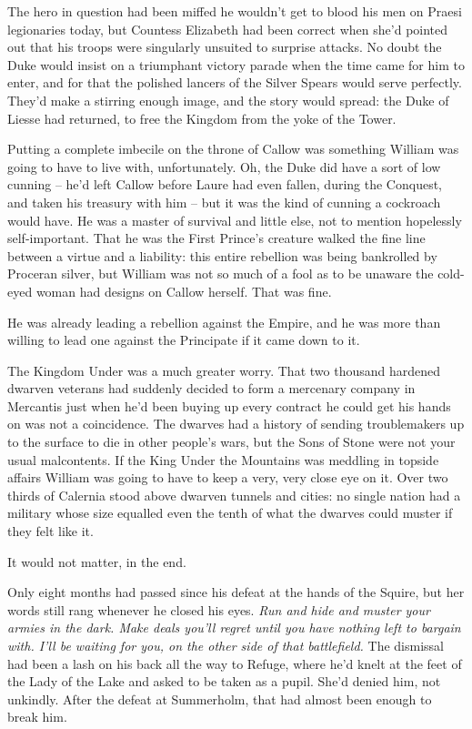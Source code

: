 \documentclass[12pt, openany]{book}
\begin{document}
The hero in question had been miffed he wouldn’t get to blood his men on Praesi legionaries today, but Countess Elizabeth had been correct when she’d pointed out that his troops were singularly unsuited to surprise attacks. No doubt the Duke would insist on a triumphant victory parade when the time came for him to enter, and for that the polished lancers of the Silver Spears would serve perfectly. They’d make a stirring enough image, and the story would spread: the Duke of Liesse had returned, to free the Kingdom from the yoke of the Tower.

Putting a complete imbecile on the throne of Callow was something William was going to have to live with, unfortunately. Oh, the Duke did have a sort of low cunning – he’d left Callow before Laure had even fallen, during the Conquest, and taken his treasury with him – but it was the kind of cunning a cockroach would have. He was a master of survival and little else, not to mention hopelessly self-important. That he was the First Prince’s creature walked the fine line between a virtue and a liability: this entire rebellion was being bankrolled by Proceran silver, but William was not so much of a fool as to be unaware the cold-eyed woman had designs on Callow herself. That was fine.

He was already leading a rebellion against the Empire, and he was more than willing to lead one against the Principate if it came down to it.

The Kingdom Under was a much greater worry. That two thousand hardened dwarven veterans had suddenly decided to form a mercenary company in Mercantis just when he’d been buying up every contract he could get his hands on was not a coincidence. The dwarves had a history of sending troublemakers up to the surface to die in other people’s wars, but the Sons of Stone were not your usual malcontents. If the King Under the Mountains was meddling in topside affairs William was going to have to keep a very, very close eye on it. Over two thirds of Calernia stood above dwarven tunnels and cities: no single nation had a military whose size equalled even the tenth of what the dwarves could muster if they felt like it.

It would not matter, in the end.

Only eight months had passed since his defeat at the hands of the Squire, but her words still rang whenever he closed his eyes. \textit{Run and hide and muster your armies in the dark. Make deals you’ll regret until you have nothing left to bargain with. I’ll be waiting for you, on the other side of that battlefield.} The dismissal had been a lash on his back all the way to Refuge, where he’d knelt at the feet of the Lady of the Lake and asked to be taken as a pupil. She’d denied him, not unkindly. After the defeat at Summerholm, that had almost been enough to break him.
\end{document}
